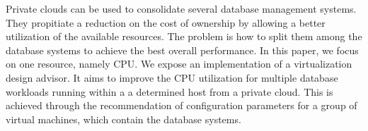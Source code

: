 Private clouds can be used to consolidate several database management systems. They propitiate a reduction on the cost of ownership by allowing a better utilization of the available resources. The problem is how to split them among the database systems to achieve the best overall performance. In this paper, we focus on one resource, namely CPU. We expose an implementation of a virtualization design advisor. It aims to improve the CPU utilization for multiple database workloads running within a a determined host from a private cloud. This is achieved through the recommendation of  configuration parameters for a group of virtual machines, which contain the database systems.





